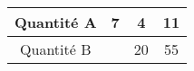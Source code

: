 \begin{tabular}{|c|c|c|c|}
\hline
Quantité A & 7 & 4 & 11 \\ \hline
Quantité B & \kern1cm & 20 & 55 \\ \hline
\end{tabular}

